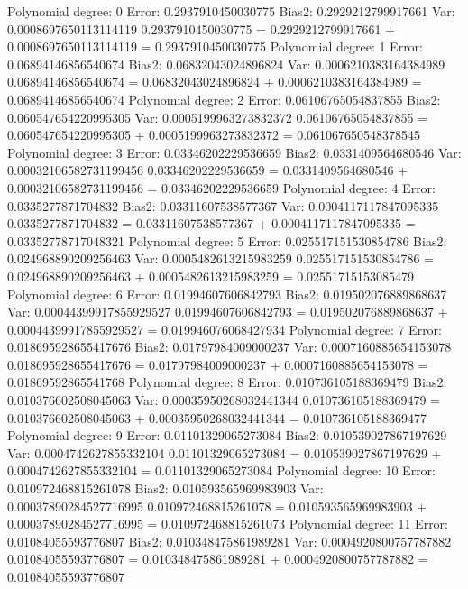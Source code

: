 \documentclass[letterpaper,10pt,english]{sphinxmanual}
\begin{document}
\begin{sphinxVerbatim}[commandchars=\\\{\}]
Polynomial degree: 0
Error: 0.2937910450030775
Bias\PYGZca{}2: 0.2929212799917661
Var: 0.0008697650113114119
0.2937910450030775 \PYGZgt{}= 0.2929212799917661 + 0.0008697650113114119 = 0.2937910450030775
Polynomial degree: 1
Error: 0.06894146856540674
Bias\PYGZca{}2: 0.06832043024896824
Var: 0.0006210383164384989
0.06894146856540674 \PYGZgt{}= 0.06832043024896824 + 0.0006210383164384989 = 0.06894146856540674
Polynomial degree: 2
Error: 0.06106765054837855
Bias\PYGZca{}2: 0.060547654220995305
Var: 0.0005199963273832372
0.06106765054837855 \PYGZgt{}= 0.060547654220995305 + 0.0005199963273832372 = 0.061067650548378545
Polynomial degree: 3
Error: 0.03346202229536659
Bias\PYGZca{}2: 0.0331409564680546
Var: 0.00032106582731199456
0.03346202229536659 \PYGZgt{}= 0.0331409564680546 + 0.00032106582731199456 = 0.03346202229536659
Polynomial degree: 4
Error: 0.0335277871704832
Bias\PYGZca{}2: 0.03311607538577367
Var: 0.0004117117847095335
0.0335277871704832 \PYGZgt{}= 0.03311607538577367 + 0.0004117117847095335 = 0.03352778717048321
Polynomial degree: 5
Error: 0.025517151530854786
Bias\PYGZca{}2: 0.024968890209256463
Var: 0.0005482613215983259
0.025517151530854786 \PYGZgt{}= 0.024968890209256463 + 0.0005482613215983259 = 0.02551715153085479
Polynomial degree: 6
Error: 0.01994607606842793
Bias\PYGZca{}2: 0.019502076889868637
Var: 0.00044399917855929527
0.01994607606842793 \PYGZgt{}= 0.019502076889868637 + 0.00044399917855929527 = 0.019946076068427934
Polynomial degree: 7
Error: 0.018695928655417676
Bias\PYGZca{}2: 0.01797984009000237
Var: 0.0007160885654153078
0.018695928655417676 \PYGZgt{}= 0.01797984009000237 + 0.0007160885654153078 = 0.01869592865541768
Polynomial degree: 8
Error: 0.010736105188369479
Bias\PYGZca{}2: 0.010376602508045063
Var: 0.00035950268032441344
0.010736105188369479 \PYGZgt{}= 0.010376602508045063 + 0.00035950268032441344 = 0.010736105188369477
Polynomial degree: 9
Error: 0.01101329065273084
Bias\PYGZca{}2: 0.010539027867197629
Var: 0.0004742627855332104
0.01101329065273084 \PYGZgt{}= 0.010539027867197629 + 0.0004742627855332104 = 0.01101329065273084
Polynomial degree: 10
Error: 0.010972468815261078
Bias\PYGZca{}2: 0.010593565969983903
Var: 0.00037890284527716995
0.010972468815261078 \PYGZgt{}= 0.010593565969983903 + 0.00037890284527716995 = 0.010972468815261073
Polynomial degree: 11
Error: 0.01084055593776807
Bias\PYGZca{}2: 0.010348475861989281
Var: 0.0004920800757787882
0.01084055593776807 \PYGZgt{}= 0.010348475861989281 + 0.0004920800757787882 = 0.01084055593776807

\end{sphinxVerbatim}
\end{document}
